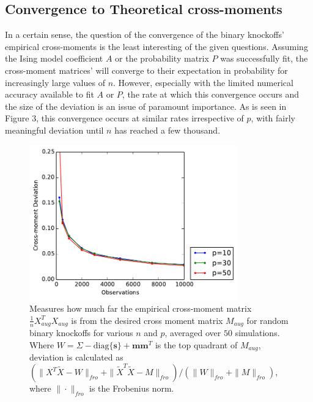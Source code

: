 \documentclass[11pt]{article}
\newcommand{\diag}[1]{\mathrm{diag}\{#1\}}
\theoremstyle{definition}
\begin{document}
\subsection{Convergence to Theoretical cross-moments} 
    \FloatBarrier
        In a certain sense, the question of the convergence of the binary knockoffs' empirical cross-moments is the least interesting of the given questions. Assuming the Ising model coefficient $A$ or the probability matrix $P$ was successfully fit, the cross-moment matrices' will converge to their expectation in probability for increasingly large values of $n$. However, especially with the limited numerical accuracy available to fit $A$ or $P$, the rate at which this convergence occurs and the size of the deviation is an issue of paramount importance. As is seen in Figure 3, this convergence occurs at similar rates irrespective of $p$, with fairly meaningful deviation until $n$ has reached a few thousand.
    \begin{figure}[h]
        \begin{center}
            \includegraphics[width=9cm]{images/sigma_fit}
    \end{center}
    \caption{\linespread{1}\selectfont{}Measures how much far the empirical cross-moment matrix $\frac{1}{n}X_{aug}^TX_{aug}$ is from the desired cross moment matrix $M_{aug}$ for random binary knockoffs for various $n$ and $p$, averaged over $50$ simulations. Where $W = \Sigma - \diag{\mathbf s} + \mathbf m \mathbf m^T$ is the top quadrant of $M_{aug}$, deviation is calculated as $(\|X^T\tilde X - W\|_{fro} + \|\tilde X^T \tilde X - M\|_{fro})/(\|W\|_{fro}+\|M\|_{fro})$, where $\| \cdot \|_{fro}$ is the Frobenius norm.}  
    \end{figure}


    \FloatBarrier
\end{document}
